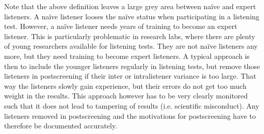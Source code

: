 \documentclass[letterpaper,10pt,english]{jupyterBook}
\begin{document}
\sphinxAtStartPar
Note that the above definition leaves a large grey area between naïve
and expert listeners. A naïve listener looses the naïve status when
participating in a listening test. However, a naïve listener needs years
of training to become an expert listener. This is particularly
problematic in research labs, where there are plenty of young
researchers available for listening tests. They are not naïve listeners
any more, but they need training to become expert listeners. A typical
approach is then to include the younger listeners regularly in listening
tests, but remove those listeners in post\sphinxhyphen{}screening if their inter\sphinxhyphen{} or
intra\sphinxhyphen{}listener variance is too large. That way the listeners slowly gain
experience, but their errors do not get too much weight in the results.
This approach however has to be very clearly monitored such that it does
not lead to tampering of results (i.e. scientific misconduct). Any
listeners removed in post\sphinxhyphen{}screening and the motivations for
post\sphinxhyphen{}screening have to therefore be documented accurately.
\end{document}
